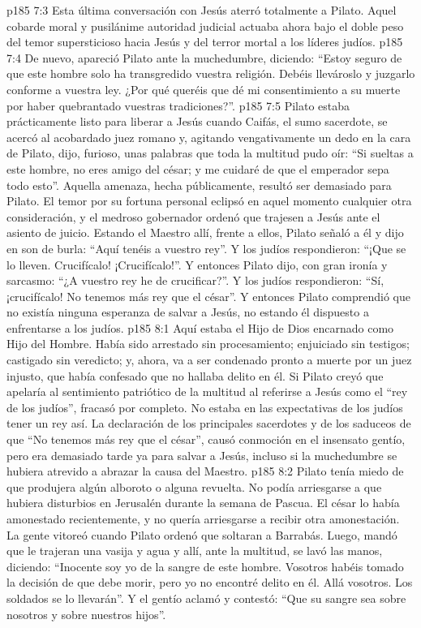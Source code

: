 \vs p185 7:3 Esta última conversación con Jesús aterró totalmente a Pilato. Aquel cobarde moral y pusilánime autoridad judicial actuaba ahora bajo el doble peso del temor supersticioso hacia Jesús y del terror mortal a los líderes judíos.
\vs p185 7:4 De nuevo, apareció Pilato ante la muchedumbre, diciendo: “Estoy seguro de que este hombre solo ha transgredido vuestra religión. Debéis llevároslo y juzgarlo conforme a vuestra ley. ¿Por qué queréis que dé mi consentimiento a su muerte por haber quebrantado vuestras tradiciones?”.
\vs p185 7:5 Pilato estaba prácticamente listo para liberar a Jesús cuando Caifás, el sumo sacerdote, se acercó al acobardado juez romano y, agitando vengativamente un dedo en la cara de Pilato, dijo, furioso, unas palabras que toda la multitud pudo oír: “Si sueltas a este hombre, no eres amigo del césar; y me cuidaré de que el emperador sepa todo esto”. Aquella amenaza, hecha públicamente, resultó ser demasiado para Pilato. El temor por su fortuna personal eclipsó en aquel momento cualquier otra consideración, y el medroso gobernador ordenó que trajesen a Jesús ante el asiento de juicio. Estando el Maestro allí, frente a ellos, Pilato señaló a él y dijo en son de burla: “Aquí tenéis a vuestro rey”. Y los judíos respondieron: “¡Que se lo lleven. Crucifícalo! ¡Crucifícalo!”. Y entonces Pilato dijo, con gran ironía y sarcasmo: “¿A vuestro rey he de crucificar?”. Y los judíos respondieron: “Sí, ¡crucifícalo! No tenemos más rey que el césar”. Y entonces Pilato comprendió que no existía ninguna esperanza de salvar a Jesús, no estando él dispuesto a enfrentarse a los judíos.
\vs p185 8:1 Aquí estaba el Hijo de Dios encarnado como Hijo del Hombre. Había sido arrestado sin procesamiento; enjuiciado sin testigos; castigado sin veredicto; y, ahora, va a ser condenado pronto a muerte por un juez injusto, que había confesado que no hallaba delito en él. Si Pilato creyó que apelaría al sentimiento patriótico de la multitud al referirse a Jesús como el “rey de los judíos”, fracasó por completo. No estaba en las expectativas de los judíos tener un rey así. La declaración de los principales sacerdotes y de los saduceos de que “No tenemos más rey que el césar”, causó conmoción en el insensato gentío, pero era demasiado tarde ya para salvar a Jesús, incluso si la muchedumbre se hubiera atrevido a abrazar la causa del Maestro.
\vs p185 8:2 \pc Pilato tenía miedo de que produjera algún alboroto o alguna revuelta. No podía arriesgarse a que hubiera disturbios en Jerusalén durante la semana de Pascua. El césar lo había amonestado recientemente, y no quería arriesgarse a recibir otra amonestación. La gente vitoreó cuando Pilato ordenó que soltaran a Barrabás. Luego, mandó que le trajeran una vasija y agua y allí, ante la multitud, se lavó las manos, diciendo: “Inocente soy yo de la sangre de este hombre. Vosotros habéis tomado la decisión de que debe morir, pero yo no encontré delito en él. Allá vosotros. Los soldados se lo llevarán”. Y el gentío aclamó y contestó: “Que su sangre sea sobre nosotros y sobre nuestros hijos”.
